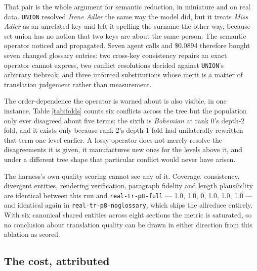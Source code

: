 \documentclass[11pt]{article}
\begin{document}
That pair is the whole argument for semantic reduction, in miniature and on real data.
\texttt{UNION} resolved \emph{Irene Adler} the same way the model did, but it treats
\emph{Miss Adler} as an unrelated key and left it spelling the surname the other way, because
set union has no notion that two keys are about the same person. The semantic operator noticed
and propagated. Seven agent calls and \$0.0894 therefore bought seven changed glossary entries:
two cross-key consistency repairs an exact operator cannot express, two conflict resolutions
decided against \texttt{UNION}'s arbitrary tiebreak, and three unforced substitutions whose
merit is a matter of translation judgement rather than measurement.

The order-dependence the operator is warned about is also visible, in one instance. Table
\ref{tab:folds} counts six conflicts across the tree but the population only ever disagreed
about five terms; the sixth is \emph{Bohemian} at rank 0's depth-2 fold, and it exists only
because rank 2's depth-1 fold had unilaterally rewritten that term one level earlier. A lossy
operator does not merely resolve the disagreements it is given, it manufactures new ones for the
levels above it, and under a different tree shape that particular conflict would never have
arisen.

The harness's own quality scoring cannot see any of it. Coverage, consistency, divergent
entities, rendering verification, paragraph fidelity and length plausibility are identical
between this run and \texttt{real-tr-p8-full} --- 1.0, 1.0, 0, 1.0, 1.0, 1.0 --- and identical
again in \texttt{real-tr-p8-noglossary}, which skips the allreduce entirely. With six canonical
shared entities across eight sections the metric is saturated, so no conclusion about
translation quality can be drawn in either direction from this ablation as scored.

\subsection{The cost, attributed}
\end{document}

